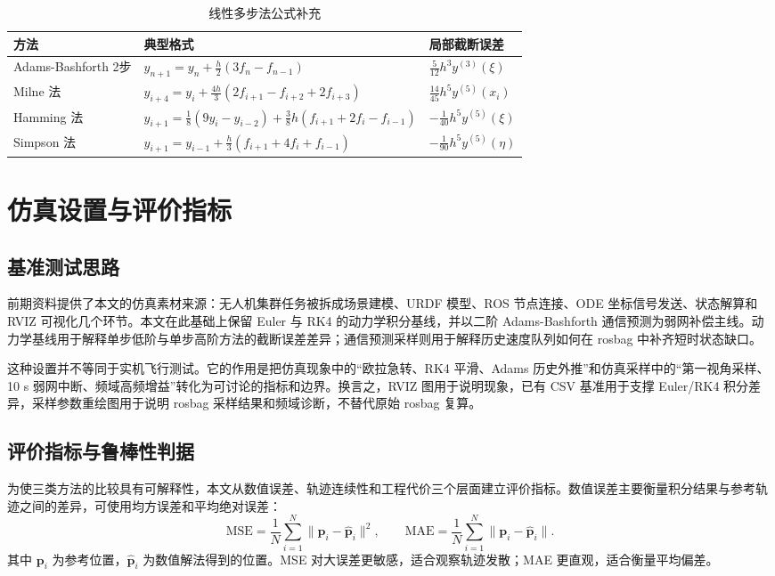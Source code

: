 \documentclass[UTF8,zihao=-4]{ctexart}
\begin{document}
\begin{table}[H]
  \centering
  \caption{线性多步法公式补充}
  \label{tab:lmm-formulas}
  \begin{tabularx}{\textwidth}{>{\centering\arraybackslash}p{2.4cm} X >{\centering\arraybackslash}p{3.0cm}}
    \toprule
    方法 & 典型格式 & 局部截断误差 \\
    \midrule
    Adams-Bashforth 2步 & $y_{n+1}=y_n+\frac{h}{2}(3f_n-f_{n-1})$ & $\frac{5}{12}h^3y^{(3)}(\xi)$ \\
    Milne 法 & $y_{i+4}=y_i+\frac{4h}{3}(2f_{i+1}-f_{i+2}+2f_{i+3})$ & $\frac{14}{45}h^5y^{(5)}(x_i)$ \\
    Hamming 法 & $y_{i+1}=\frac{1}{8}(9y_i-y_{i-2})+\frac{3}{8}h(f_{i+1}+2f_i-f_{i-1})$ & $-\frac{1}{40}h^5y^{(5)}(\xi)$ \\
    Simpson 法 & $y_{i+1}=y_{i-1}+\frac{h}{3}(f_{i+1}+4f_i+f_{i-1})$ & $-\frac{1}{90}h^5y^{(5)}(\eta)$ \\
    \bottomrule
  \end{tabularx}
\end{table}

\section{仿真设置与评价指标}

\subsection{基准测试思路}
前期资料提供了本文的仿真素材来源：无人机集群任务被拆成场景建模、URDF 模型、ROS 节点连接、ODE 坐标信号发送、状态解算和 RVIZ 可视化几个环节。本文在此基础上保留 Euler 与 RK4 的动力学积分基线，并以二阶 Adams-Bashforth 通信预测为弱网补偿主线。动力学基线用于解释单步低阶与单步高阶方法的截断误差差异；通信预测采样则用于解释历史速度队列如何在 rosbag 中补齐短时状态缺口。

这种设置并不等同于实机飞行测试。它的作用是把仿真现象中的“欧拉急转、RK4 平滑、Adams 历史外推”和仿真采样中的“第一视角采样、10 s 弱网中断、频域高频增益”转化为可讨论的指标和边界。换言之，RVIZ 图用于说明现象，已有 CSV 基准用于支撑 Euler/RK4 积分差异，采样参数重绘图用于说明 rosbag 采样结果和频域诊断，不替代原始 rosbag 复算。

\subsection{评价指标与鲁棒性判据}
为使三类方法的比较具有可解释性，本文从数值误差、轨迹连续性和工程代价三个层面建立评价指标。数值误差主要衡量积分结果与参考轨迹之间的差异，可使用均方误差和平均绝对误差：
\begin{equation}
  \mathrm{MSE}=\frac{1}{N}\sum_{i=1}^{N}\|\bm p_i-\hat{\bm p}_i\|^2,\qquad
  \mathrm{MAE}=\frac{1}{N}\sum_{i=1}^{N}\|\bm p_i-\hat{\bm p}_i\|.
  \label{eq:mse-mae}
\end{equation}
其中 $\bm p_i$ 为参考位置，$\hat{\bm p}_i$ 为数值解法得到的位置。MSE 对大误差更敏感，适合观察轨迹发散；MAE 更直观，适合衡量平均偏差。
\end{document}
